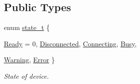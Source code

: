 \subsection*{Public Types}
\begin{DoxyCompactItemize}
\item 
enum \hyperlink{classmdt_device_a39c301b1fda803dba0c9ab98164a9d1e}{state\_\-t} \{ \par
\hyperlink{classmdt_device_a39c301b1fda803dba0c9ab98164a9d1ea577f509c27c399a211c5dc18c0235b69}{Ready} =  0, 
\hyperlink{classmdt_device_a39c301b1fda803dba0c9ab98164a9d1eae06fa1b4e5872df7470aeed0878a2947}{Disconnected}, 
\hyperlink{classmdt_device_a39c301b1fda803dba0c9ab98164a9d1ead8adc8658ebaa24f7525fe18558de4c1}{Connecting}, 
\hyperlink{classmdt_device_a39c301b1fda803dba0c9ab98164a9d1ea4a064f3dc9a486991b3ec09127b1c42a}{Busy}, 
\par
\hyperlink{classmdt_device_a39c301b1fda803dba0c9ab98164a9d1ea2f51ec62521e93aad70fe1071e32fa92}{Warning}, 
\hyperlink{classmdt_device_a39c301b1fda803dba0c9ab98164a9d1ea68b5596661e1489134e11545e92274de}{Error}
 \}
\begin{DoxyCompactList}\small\item\em State of device. \end{DoxyCompactList}\end{DoxyCompactItemize}
